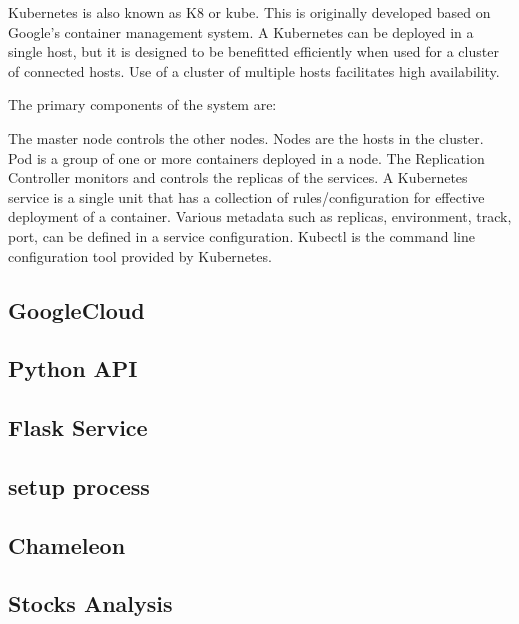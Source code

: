 Kubernetes is also known as K8 or kube. This is originally developed based on Google’s container 
management system. A Kubernetes can be deployed in a single host, but it is designed to be
benefitted efficiently when used for a cluster of connected hosts. Use of a cluster of 
multiple hosts facilitates high availability.


The primary components of the system are: 

The master node controls the other nodes. Nodes are the hosts in the cluster. Pod is a group 
of one or more containers deployed in a node.  The Replication Controller monitors and controls
the replicas of the services. A Kubernetes service is a single unit that has a collection of 
rules/configuration for effective deployment of a container. Various metadata such as replicas,
environment, track, port, can be defined in a service configuration. Kubectl is the command line 
configuration tool provided by Kubernetes. 


\subsection{GoogleCloud}

\subsection{Python API}

\subsection{Flask Service}

\subsection{setup process}

\subsection{Chameleon}

\subsection{Stocks Analysis}


